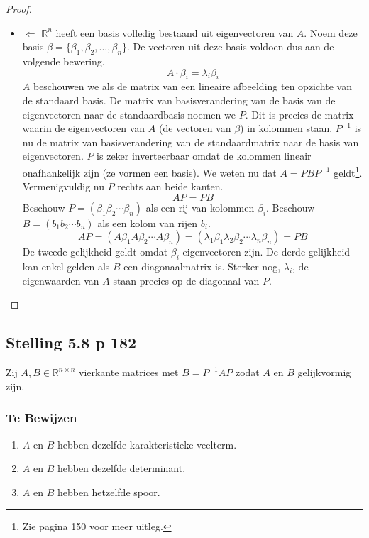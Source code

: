 \documentclass[lineaire_algebra_oplossingen.tex]{subfiles}
\begin{document}
\begin{proof}
\begin{itemize}
\item $\Leftarrow$
$\mathbb{R}^n$ heeft een basis volledig bestaand uit eigenvectoren van $A$. Noem deze basis $\beta = \{\beta_1,\beta_2,...,\beta_n\}$. De vectoren uit deze basis voldoen dus aan de volgende bewering.
\[
A\cdot \beta_i = \lambda_i\beta_i
\]
$A$ beschouwen we als de matrix van een lineaire afbeelding ten opzichte van de standaard basis.
De matrix van basisverandering van de basis van de eigenvectoren naar de standaardbasis noemen we $P$.
Dit is precies de matrix waarin de eigenvectoren van $A$ (de vectoren van $\beta$) in kolommen staan.
$P^{-1}$ is nu de matrix van basisverandering van de standaardmatrix naar de basis van eigenvectoren.
$P$ is zeker inverteerbaar omdat de kolommen lineair onafhankelijk zijn (ze vormen een basis).
We weten nu dat $A = PBP^{-1}$ geldt\footnote{Zie pagina 150 voor meer uitleg.}. Vermenigvuldig nu $P$ rechts aan beide kanten.
\[
AP = PB
\]
Beschouw $P = (\beta_1 \beta_2 \cdots \beta _n)$ als een rij van kolommen $\beta_i$. Beschouw $B = (b_1 b_2 \cdots b_n)$ als een kolom van rijen $b_i$.
\[
AP = (A\beta_1 A\beta_2 \cdots A\beta_n) = (\lambda_1\beta_1 \lambda_2\beta_2 \cdots \lambda_n\beta_n) = PB
\]
De tweede gelijkheid geldt omdat $\beta_i$ eigenvectoren zijn.
De derde gelijkheid kan enkel gelden als $B$ een diagonaalmatrix is. Sterker nog, $\lambda_i$, de eigenwaarden van $A$ staan precies op de diagonaal van $P$.

\end{itemize}
\end{proof}

\subsection{Stelling 5.8 p 182}
Zij $A,B \in \mathbb{R}^{n\times n}$ vierkante matrices met $B = P^{-1}AP$ zodat $A$ en $B$ gelijkvormig zijn.
\subsubsection*{Te Bewijzen}
\begin{enumerate}
\item $A$ en $B$ hebben dezelfde karakteristieke veelterm.
\item $A$ en $B$ hebben dezelfde determinant.
\item $A$ en $B$ hebben hetzelfde spoor.
\end{enumerate}
\end{document}
